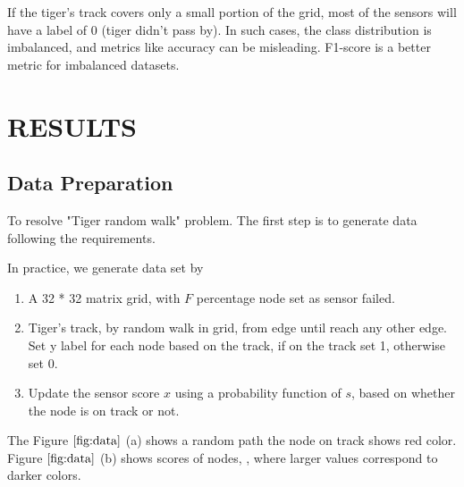 \documentclass{article}
\begin{document}
If the tiger's track covers only a small portion of the grid, most of the sensors will have a label of 0 (tiger didn't pass by). In such cases, the class distribution is imbalanced, and metrics like accuracy can be misleading. F1-score is a better metric for imbalanced datasets.

\section{RESULTS}
\label{sec:results}

\subsection{Data Preparation}
\label{ssec:data}
To resolve "Tiger random walk" problem. 
The first step is to generate data following the requirements.

In practice, we generate data set by

\begin{enumerate}
  \item A 32 * 32 matrix grid, with $F$ percentage node set as sensor failed.
  \item Tiger's track, by random walk in grid, from edge until reach any other edge.
        \\ Set y label for each node based on the track, if on the track set 1, otherwise set 0.
  \item Update the sensor score $x$ using a probability function of $s$, based on whether the node is on track or not.
\end{enumerate}

The Figure $\ref{fig:data}$ (a) shows a random path the node on track shows red color.
Figure $\ref{fig:data}$ (b) shows scores of nodes, , where larger values correspond to darker colors.
\end{document}
